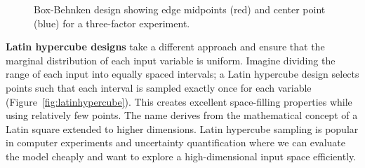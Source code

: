 \begin{figure}[H]
    \centering
    \caption{Box-Behnken design showing edge midpoints (red) and center point (blue) for a three-factor experiment.}
    \label{fig:boxbehnken}
\end{figure}

\textbf{Latin hypercube designs} take a different approach and ensure that the marginal distribution of each input variable is uniform. Imagine dividing the range of each input into equally spaced intervals; a Latin hypercube design selects points such that each interval is sampled exactly once for each variable (Figure~\ref{fig:latinhypercube}). This creates excellent space-filling properties while using relatively few points. The name derives from the mathematical concept of a Latin square extended to higher dimensions. Latin hypercube sampling is popular in computer experiments and uncertainty quantification where we can evaluate the model cheaply and want to explore a high-dimensional input space efficiently.

